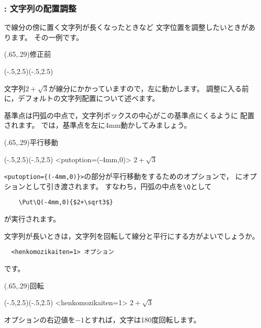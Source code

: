 \subsubsection{\texorpdfstring{}{HenKo} : 文字列の配置調整}
で線分の傍に置く文字列が長くなったときなど
文字位置を調整したいときがあります。
その一例です。

\begin{showEx}(.65,.29){修正前}
\footnotesize
\drawaxisfalse
\begin{zahyou}(-.5,2.5)(-.5,2.5)
\Thicklines
{}
\thinlines
\HenKo\A{}
\end{zahyou}
\end{showEx}

文字列$2+\sqrt{3}$が線分にかかっていますので，左に動かします。
調整に入る前に，デフォルトの文字列配置について述べます。

基準点は円弧の中点で，文字列ボックスの中心がこの基準点にくるように
配置されます。
では，基準点を左に4mm動かしてみましょう。
\begin{showEx}(.65,.29){平行移動}
\footnotesize
\drawaxisfalse
\begin{zahyou}(-.5,2.5)(-.5,2.5)
\Thicklines
{}
\thinlines
\HenKo<putoption={(-4mm,0)}>\A\B%
{$2+\sqrt3$}
\end{zahyou}
\end{showEx}
\verb/<putoption={(-4mm,0)}>/の部分が平行移動をするためのオプションで，
にオプションとして引き渡されます。
すなわち，円弧の中点を\verb/\Q/として
\begin{verbatim}
    \Put\Q(-4mm,0){$2+\sqrt3$}
\end{verbatim}
が実行されます。

文字列が長いときは，文字列を回転して線分と平行にする方がよいでしょうか。
\begin{verbatim}
  <henkomozikaiten=1> オプション
\end{verbatim}
です。

\begin{showEx}(.65,.29){回転}
\footnotesize
\drawaxisfalse
\begin{zahyou}(-.5,2.5)(-.5,2.5)
\HenKo<henkomozikaiten=1>\A\B%
{$2+\sqrt3$}
{\Thicklines\Drawline{\A\B}}
\end{zahyou}
\end{showEx}

オプションの右辺値を$-1$とすれば，文字は180度回転します。

